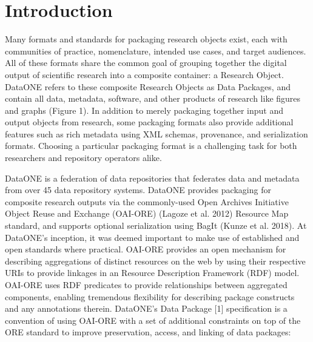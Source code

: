 \documentclass[conference]{IEEEtran}
\begin{document}
\section{Introduction}

Many formats and standards for packaging research objects exist, each with communities of practice, nomenclature, intended use cases, and target audiences. All of these formats share the common goal of grouping together the digital output of scientific research into a composite container: a Research Object. DataONE refers to these composite Research Objects as Data Packages, and contain all data, metadata, software, and other products of research like figures and graphs (Figure 1). In addition to merely packaging together input and output objects from research, some packaging formats also provide additional features such as rich metadata using XML schemas, provenance, and serialization formats. Choosing a particular packaging format is a challenging task for both researchers
and repository operators alike.

DataONE is a federation of data repositories that federates data and metadata from over 45 data repository systems. DataONE provides packaging for composite research outputs via the commonly-used Open Archives Initiative Object Reuse and Exchange (OAI-ORE) (Lagoze et al. 2012) Resource Map standard, and supports optional serialization using BagIt (Kunze et al. 2018). At DataONE’s inception, it was deemed important to make use of established and open standards where practical. OAI-ORE provides an open mechanism for describing aggregations of distinct resources on the web by using their respective URIs to provide linkages in an Resource Description Framework (RDF) model. OAI-ORE uses RDF predicates to provide relationships between aggregated components, enabling tremendous flexibility for describing package constructs and any annotations therein. DataONE’s Data Package [1] specification is a convention of using OAI-ORE with a set of additional constraints on top of the ORE standard to improve preservation, access, and linking of data packages:
\end{document}
